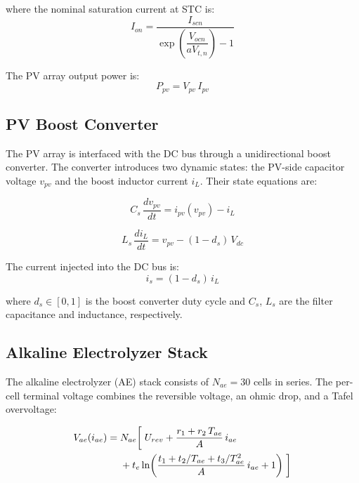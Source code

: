 \documentclass[journal]{IEEEtran}
\begin{document}
where the nominal saturation current at STC is:
\begin{equation}
I_{on} = \frac{I_{scn}}{\exp\!\left(\dfrac{V_{ocn}}{aV_{t,n}}\right)-1}
\label{eq:pv_ion}
\end{equation}

The PV array output power is:
\begin{equation}
P_{pv} = V_{pv}\,I_{pv}
\label{eq:pv_power}
\end{equation}

\subsection{PV Boost Converter}
\label{subsec:pv_conv}

The PV array is interfaced with the DC bus through a unidirectional boost
converter. The converter introduces two dynamic states: the PV-side
capacitor voltage $v_{pv}$ and the boost inductor current $i_L$. Their
state equations are:

\begin{equation}
C_s\,\frac{dv_{pv}}{dt} = i_{pv}(v_{pv}) - i_L
\label{eq:pv_cap}
\end{equation}

\begin{equation}
L_s\,\frac{di_L}{dt} = v_{pv} - (1-d_s)\,V_{dc}
\label{eq:pv_ind}
\end{equation}

The current injected into the DC bus is:
\begin{equation}
i_s = (1-d_s)\,i_L
\label{eq:pv_is}
\end{equation}

where $d_s \in [0,1]$ is the boost converter duty cycle and $C_s$, $L_s$
are the filter capacitance and inductance, respectively.

\subsection{Alkaline Electrolyzer Stack}
\label{subsec:ae_stack}

The alkaline electrolyzer (AE) stack consists of $N_{ae} = 30$ cells in
series. The per-cell terminal voltage combines the reversible voltage, an
ohmic drop, and a Tafel overvoltage:

\begin{equation}
\begin{split}
V_{ae}(i_{ae}) = \; & N_{ae}\!\left[\vphantom{\frac{t_1}{A}}\right. U_{rev} + \frac{r_1 +   r_2\,T_{ae}}{A}\,i_{ae} \\
                    &+ t_e\ln\!\left(
                        \frac{t_1+t_2/T_{ae}+t_3/T_{ae}^2}{A}\,i_{ae}+1
                      \right)
                    \left.\vphantom{\frac{t_1}{A}}\right]
\end{split}
\label{eq:ae_voltage}
\end{equation}
\end{document}
